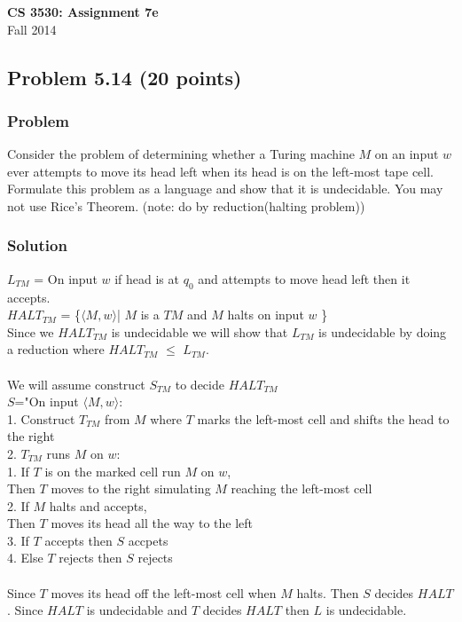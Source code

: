 \documentclass{article}
\begin{document}
\begin{center}
\textbf{\Large CS 3530: Assignment 7e} \\[2mm]
Fall 2014
\end{center}

\raggedright

\subsection*{Problem 5.14 (20 points)}

\subsubsection*{Problem}

Consider the problem of determining whether a Turing machine $M$ on
an input $w$ ever attempts to move its head left when its head is on
the left-most tape cell. Formulate this problem as a language and
show that it is undecidable. You may not use Rice's Theorem.
(note: do by reduction(halting problem))
\subsubsection*{Solution}

$L_{TM}$ = On input $w$ if head is at $q_0$ and attempts to move head left then it accepts. \\
$HALT_{TM}$ = \{$\langle M, w\rangle$| $M$ is a $TM$ and $M$ halts on input $w$ \} \\
Since we $HALT_{TM}$ is undecidable we will show that $L_{TM}$ is undecidable by doing a 
reduction where $HALT_{TM}$ $\leq$ $L_{TM}$. \\ \ \\

We will assume construct $S_{TM}$ to decide $HALT_{TM}$ \\
$S$="On input $\langle M, w\rangle$: \\
\hspace{5 mm}	1. Construct $T_{TM}$ from $M$ where $T$ marks the left-most cell and shifts the head to the right \\
\hspace{5 mm}	2. $T_{TM}$ runs $M$ on $w$: \\
\hspace{10 mm}		1. If $T$ is on the marked cell run $M$ on $w$, \\
\hspace{15 mm}			Then $T$ moves to the right simulating $M$ reaching the left-most cell \\
\hspace{10 mm}		2. If $M$ halts and accepts, \\
\hspace{15 mm}			Then $T$ moves its head all the way to the left \\
\hspace{5 mm}	3. If $T$ accepts then $S$ accpets \\
\hspace{5 mm}	4. Else $T$ rejects then $S$ rejects \\ \ \\

Since $T$ moves its head off the left-most cell when $M$ halts. Then $S$ decides $HALT$.
Since $HALT$ is undecidable and $T$ decides $HALT$ then $L$ is undecidable.
\end{document}
